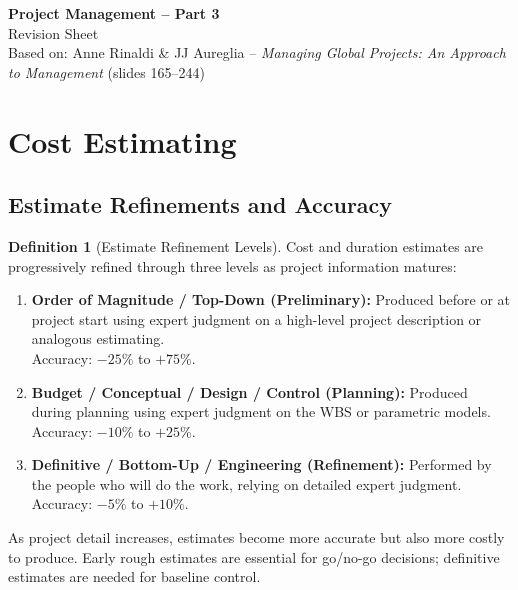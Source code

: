 \documentclass[11pt,a4paper]{article}
\theoremstyle{definition}
\newtheorem{definition}{Definition}[section]
\theoremstyle{plain}
\begin{document}
\begin{center}
{\LARGE\bfseries Project Management -- Part 3}\\[6pt]
{\large Revision Sheet}\\[4pt]
{\small Based on: Anne Rinaldi \& JJ Aureglia -- \emph{Managing Global Projects: An Approach to Management} (slides 165--244)}
\end{center}
\vspace{0.5cm}

\section{Cost Estimating}

\subsection{Estimate Refinements and Accuracy}

\begin{definition}[Estimate Refinement Levels]
Cost and duration estimates are progressively refined through three levels as project information matures:
\begin{enumerate}[label=\arabic*.]
  \item \textbf{Order of Magnitude / Top-Down (Preliminary):} Produced before or at project start using expert judgment on a high-level project description or analogous estimating. \\
        Accuracy: $-25\%$ to $+75\%$.
  \item \textbf{Budget / Conceptual / Design / Control (Planning):} Produced during planning using expert judgment on the WBS or parametric models. \\
        Accuracy: $-10\%$ to $+25\%$.
  \item \textbf{Definitive / Bottom-Up / Engineering (Refinement):} Performed by the people who will do the work, relying on detailed expert judgment. \\
        Accuracy: $-5\%$ to $+10\%$.
\end{enumerate}
\end{definition}

\begin{remark}
As project detail increases, estimates become more accurate but also more costly to produce. Early rough estimates are essential for go/no-go decisions; definitive estimates are needed for baseline control.
\end{remark}
\end{document}
